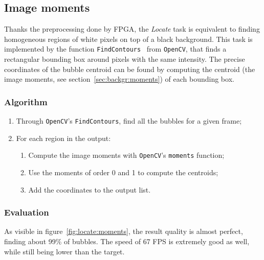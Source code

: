 \subsection{Image moments}

Thanks the preprocessing done by FPGA, the \textit{Locate} task is equivalent to finding homogeneous regions of white pixels on top of a black background.
This task is implemented by the function \texttt{FindContours}~\cite{findcontours} from \texttt{OpenCV}, that finds a rectangular bounding box around pixels with the same intensity.
The precise coordinates of the bubble centroid can be found by computing the centroid (the image moments, see section~\ref{sec:backgr:moments}) of each bounding box.

\subsubsection{Algorithm}

\begin{enumerate}
	\itemsep 0em
	\item Through \texttt{OpenCV}'s \texttt{FindContours}, find all the bubbles for a given frame;
	\item For each region in the output:
	      \begin{enumerate}
		      \item Compute the image moments with \texttt{OpenCV}'s \texttt{moments} function;
		      \item Use the moments of order 0 and 1 to compute the centroids;
		      \item Add the coordinates to the output list.
	      \end{enumerate}
\end{enumerate}

\subsubsection{Evaluation}

As visible in figure~\ref{fig:locate:moments}, the result quality is almost perfect, finding about 99\% of bubbles.
The speed of 67 FPS is extremely good as well, while still being lower than the target.

